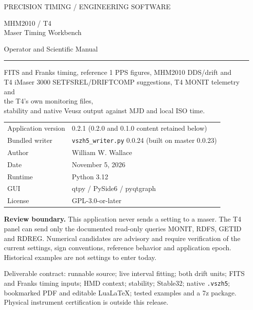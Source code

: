 \documentclass[11pt,a4paper]{article}
\newcommand{\warning}[1]{\par\noindent\colorbox{light}{\parbox{\dimexpr\linewidth-2\fboxsep}{\textbf{Review boundary.} #1}}\par}
\begin{document}
\begin{titlepage}
{\sffamily\color{teal}\large PRECISION TIMING / ENGINEERING SOFTWARE\par}
\vspace{18mm}
{\sffamily\color{navy}\Huge MHM2010 / T4\\Maser Timing Workbench\par}
\vspace{5mm}
{\sffamily\Large Operator and Scientific Manual\par}
\vspace{9mm}
\rule{\linewidth}{1pt}
\vspace{5mm}
{\large FITS and Franks timing, reference 1 PPS figures, MHM2010 DDS/drift and\\
T4 iMaser 3000 SETFSREL/DRIFTCOMP suggestions, T4 MONIT telemetry and\\
the T4's own monitoring files,\\
stability and native Veusz output against MJD and local ISO time.\par}
\vspace{12mm}
\begin{tabular}{@{}ll@{}}
Application version & 0.2.1 (0.2.0 and 0.1.0 content retained below)\\
Bundled writer & \texttt{vszh5\_writer.py} 0.0.24 (built on master 0.0.23)\\
Author & William W. Wallace\\
Date & November 5, 2026\\
Runtime & Python 3.12\\
GUI & qtpy / PySide6 / pyqtgraph\\
License & GPL-3.0-or-later\\
\end{tabular}
\vfill
\warning{This application never sends a setting to a maser. The T4 panel can
send only the documented read-only queries MONIT, RDFS, GETID and RDREG.
Numerical candidates are advisory and require verification of the current
settings, sign conventions, reference behavior and application epoch.
Historical examples are not settings to enter today.}
\vspace{5mm}
{\small Deliverable contract: runnable source; live interval fitting; both drift
units; FITS and Franks timing inputs; HMD context; stability; Stable32; native
\texttt{.vszh5}; bookmarked PDF and editable LuaLaTeX; tested examples and a 7z package.
Physical instrument certification is outside this release.}
\end{titlepage}
\tableofcontents
\clearpage
\end{document}
